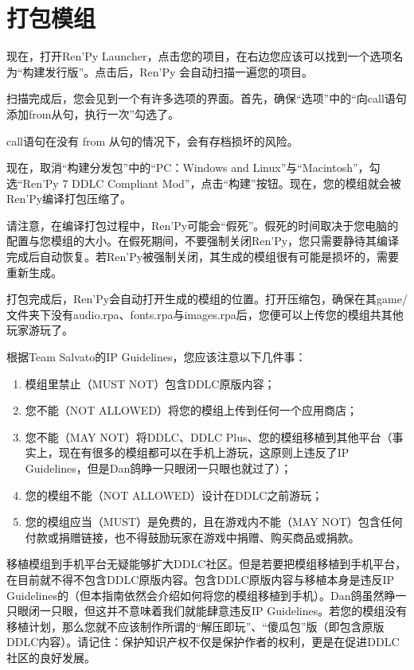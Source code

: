 \section{打包模组}
现在，打开Ren'Py Launcher，点击您的项目，在右边您应该可以找到一个选项名为“构建发行版”。点击后，Ren'Py 会自动扫描一遍您的项目。

扫描完成后，您会见到一个有许多选项的界面。首先，确保“选项”中的“向call语句添加from从句，执行一次”勾选了。
\begin{ExtraKnowledge}
    call语句在没有 from 从句的情况下，会有存档损坏的风险。
\end{ExtraKnowledge}
现在，取消“构建分发包”中的“PC：Windows and Linux”与“Macintosh”，勾选“Ren'Py 7 DDLC Compliant Mod”，点击“构建”按钮。现在，您的模组就会被Ren'Py编译打包压缩了。
\begin{Warning}
    请注意，在编译打包过程中，Ren'Py可能会“假死”。假死的时间取决于您电脑的配置与您模组的大小。在假死期间，不要强制关闭Ren'Py，您只需要静待其编译完成后自动恢复。若Ren'Py被强制关闭，其生成的模组很有可能是损坏的，需要重新生成。
\end{Warning}

打包完成后，Ren'Py会自动打开生成的模组的位置。打开压缩包，确保在其game/文件夹下没有audio.rpa、fonts.rpa与images.rpa后，您便可以上传您的模组共其他玩家游玩了。

\begin{Attention}
    根据Team Salvato的IP Guidelines，您应该注意以下几件事：
    \begin{enumerate}
        \item 模组里禁止（MUST NOT）包含DDLC原版内容；
        \item 您不能（NOT ALLOWED）将您的模组上传到任何一个应用商店；
        \item 您不能（MAY NOT）将DDLC、DDLC Plus、您的模组移植到其他平台（事实上，现在有很多的模组都可以在手机上游玩，这原则上违反了IP Guidelines，但是Dan鸽睁一只眼闭一只眼也就过了）；
        \item 您的模组不能（NOT ALLOWED）设计在DDLC之前游玩；
        \item 您的模组应当（MUST）是免费的，且在游戏内不能（MAY NOT）包含任何付款或捐赠链接，也不得鼓励玩家在游戏中捐赠、购买商品或捐款。
    \end{enumerate}
    移植模组到手机平台无疑能够扩大DDLC社区。但是若要把模组移植到手机平台，在目前就不得不包含DDLC原版内容。包含DDLC原版内容与移植本身是违反IP Guidelines的（但本指南依然会介绍如何将您的模组移植到手机）。Dan鸽虽然睁一只眼闭一只眼，但这并不意味着我们就能肆意违反IP Guidelines。若您的模组没有移植计划，那么您就不应该制作所谓的“解压即玩”、“傻瓜包”版（即包含原版DDLC内容）。请记住：保护知识产权不仅是保护作者的权利，更是在促进DDLC社区的良好发展。
\end{Attention}